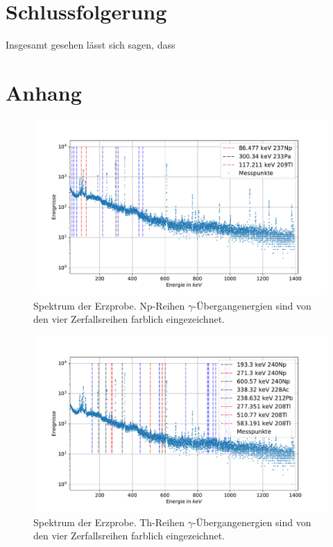 \documentclass[
	a4paper,
	12pt,
	pagesize,
	ngerman
]{scrartcl}
\begin{document}
	\section{Schlussfolgerung}
	Insgesamt gesehen lässt sich sagen, dass


	\section{Anhang} \label{s_anhang}

	\begin{figure}[H]
			\includegraphics[width= 1 \linewidth]{img/erz_Np}
			\caption{
			Spektrum der Erzprobe. Np-Reihen $\gamma$-Übergangenergien sind von den vier Zerfallsreihen farblich eingezeichnet.
			}
			\label{fg_erz_np}
	\end{figure}
	\begin{figure}[H]
			\includegraphics[width= 1 \linewidth]{img/erz_Th}
			\caption{
			Spektrum der Erzprobe. Th-Reihen $\gamma$-Übergangenergien sind von den vier Zerfallsreihen farblich eingezeichnet.
			}
			\label{fg_erz_th}
	\end{figure}
\end{document}
